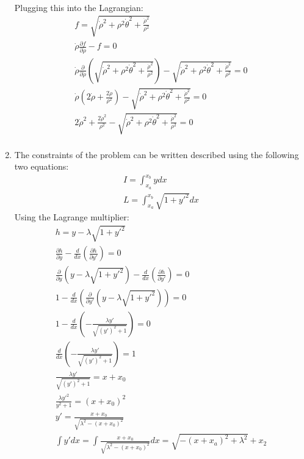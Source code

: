\documentclass[12pt]{article}
\begin{document}
\begin{enumerate}
\begin{gather*}
    \end{gather*}
    Plugging this into the Lagrangian:
    \begin{gather*}
      f=\sqrt{\dot{\rho}^2+\rho^2 \dot{\theta}^2+\frac{\dot{\rho}^2}{\rho^2}}\\
      \dot{\rho}\frac{\partial f}{\partial\dot{\rho}}-f=0\\
      \dot{\rho}\frac{\partial }{\partial\dot{\rho}}\left(\sqrt{\dot{\rho}^2+\rho^2 \dot{\theta}^2+\frac{\dot{\rho}^2}{\rho^2}}\right)-\sqrt{\dot{\rho}^2+\rho^2 \dot{\theta}^2+\frac{\dot{\rho}^2}{\rho^2}}=0\\
      \dot{\rho}\left(2\dot{\rho}+\frac{2\dot{\rho}}{\rho^2}\right)-\sqrt{\dot{\rho}^2+\rho^2 \dot{\theta}^2+\frac{\dot{\rho}^2}{\rho^2}}=0\\
      2\dot{\rho}^2+\frac{2\dot{\rho}^2}{\rho^2}-\sqrt{\dot{\rho}^2+\rho^2 \dot{\theta}^2+\frac{\dot{\rho}^2}{\rho^2}}=0\\
    \end{gather*}
    \item
    The constraints of the problem can be written described using the following two equations:
    \begin{gather*}
      I=\int_{x_a}^{x_b}ydx\\
      L=\int_{x_a}^{x_b}\sqrt{1+y'^2}dx
    \end{gather*}
    Using the Lagrange multiplier:
    \begin{gather*}
      h=y-\lambda\sqrt{1+y'^2}\\
      \frac{\partial h}{\partial y}-\frac{d}{dx}\left(\frac{\partial h}{\partial y'}\right)=0\\
      \frac{\partial}{\partial y}\left(y-\lambda\sqrt{1+y'^2}\right)-\frac{d}{dx}\left(\frac{\partial h}{\partial y'}\right)=0\\
      1-\frac{d}{dx}\left(\frac{\partial}{\partial y'}\left(y-\lambda\sqrt{1+y'^2}\right)\right)=0\\
      1-\frac{d}{dx}\left(-\frac{\lambda  y'}{\sqrt{\left(y'\right)^2+1}}\right)=0\\
      \frac{d}{dx}\left(-\frac{\lambda  y'}{\sqrt{\left(y'\right)^2+1}}\right)=1\\
      \frac{\lambda  y'}{\sqrt{\left(y'\right)^2+1}}=x+x_0\\
      \frac{\lambda  y'^2}{y^2+1}=\left(x+x_0\right)^2\\
      y'=\frac{x+x_0}{\sqrt{\lambda^2-(x+x_0)^2}}\\
      \int y' dx=\int \frac{x+x_0}{\sqrt{\lambda^2-(x+x_0)^2}}dx=\sqrt{-(x+x_a)^2+\lambda^2}+x_2\\

\end{gather*}
\end{enumerate}
\end{document}
